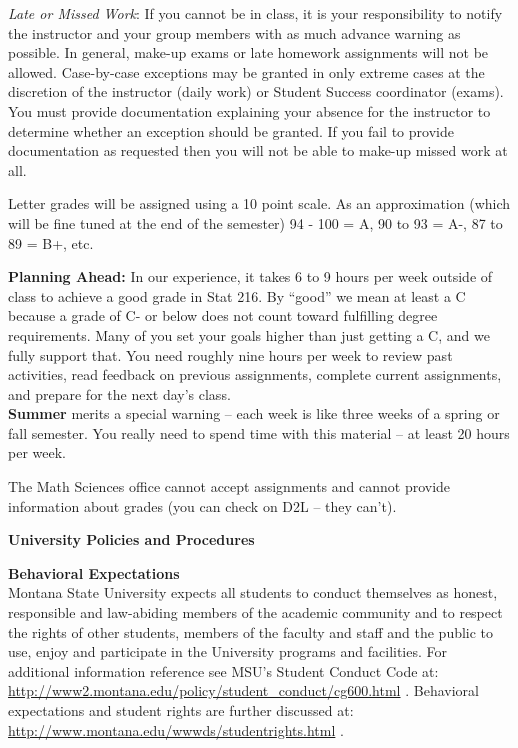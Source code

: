{\it Late or Missed Work}:  If you cannot be in class, it is your 
responsibility to notify the instructor and your group members with as
much advance warning as possible. In general, make-up exams or late
homework assignments will not be allowed. Case-by-case exceptions may
be granted in only extreme cases at the discretion of the
instructor (daily work) or Student Success coordinator (exams). You
must provide documentation explaining your absence for 
the instructor to determine whether an exception should be granted. If
you fail to provide documentation as requested then you will not be
able to make-up missed work at all.   
 
  Letter grades will be assigned using a 10 point scale.
  As an approximation (which will be fine tuned at the end of the semester)
  94 - 100 = A,  90 to 93 = A-, 87 to 89 = B+, etc.
 
{\bf Planning Ahead:}  In our experience, it takes 6 to 9 hours per
week outside of class to achieve a good grade in Stat 216.  By ``good'' we
mean at least a C because a grade of C- or below does not
count toward fulfilling degree requirements.  Many of you set your
goals higher than just getting a C, and we fully support that.  You
need roughly nine hours per week to  review past activities, read
feedback on previous assignments, complete current assignments, and
prepare for the next day's class. 
\\ 
{\bf Summer} merits a special warning -- each week is like three weeks
of a spring or fall semester.  You really need to spend time with this
material -- at least 20 hours per week.  

The Math Sciences office cannot accept assignments and cannot provide
information about grades (you can check on D2L -- they can't).


\begin{center}
{\large\bf University Policies and Procedures }  
\end{center}

{\bf Behavioral Expectations }\\
Montana State University expects all students to conduct themselves as
honest, responsible and law-abiding members of the academic community
and to respect the rights of other students, members of the faculty
and staff and the public to use, enjoy and participate in the
University programs and facilities. For additional information
reference see MSU's Student Conduct Code at: 
\url{http://www2.montana.edu/policy/student_conduct/cg600.html} .
Behavioral expectations and student rights are further discussed at:
\url{http://www.montana.edu/wwwds/studentrights.html} . 
 

